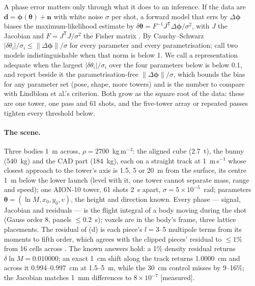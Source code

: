 \documentclass[10pt,a4paper]{article}
\newcommand{\tagM}{\textsf{\small[measured]}}
\begin{document}
A phase error matters only through what it does to an inference. If the data are
$\mathbf{d} = \boldsymbol\phi(\boldsymbol\theta)+\mathbf{n}$ with white noise $\sigma$ per shot,
a forward model that errs by $\Delta\boldsymbol\phi$ biases the maximum-likelihood estimate by
$\delta\boldsymbol\theta = F^{-1}J^{\mathsf T}\Delta\boldsymbol\phi/\sigma^2$, with $J$ the Jacobian
and $F = J^{\mathsf T}J/\sigma^2$ the Fisher matrix \citep[eq.~13]{cutler2007}. By Cauchy--Schwarz
$|\delta\theta_i|/\sigma_i\le\|\Delta\boldsymbol\phi\|/\sigma$ for every parameter and every
parametrisation; \citet[eq.~5]{lindblom2008} call two models indistinguishable when that norm is below
1. We call a representation adequate when the largest $|\delta\theta_i|/\sigma_i$ over the four
parameters below is below 0.1, and report beside it the parametrisation-free $\|\Delta\boldsymbol\phi\|/\sigma$,
which bounds the bias for any parameter set (pose, shape, more towers) and is the number to compare
with Lindblom et al.'s criterion. Both grow as the square root of the data: these are one tower, one
pass and 61 shots, and the five-tower array or repeated passes tighten every threshold below.

\paragraph{The scene.} Three bodies 1~m across, $\rho=2700$~kg\,m$^{-3}$: the aligned cube (2.7~t),
the bunny (540~kg) and the CAD part (184~kg), each on a straight track at 1~m\,s$^{-1}$ whose closest
approach to the tower's axis is 1.5, 5 or 20~m from the surface, its centre 1~m below the lower launch
(level with it, one tower cannot separate mass, range and speed); one AION-10 tower, 61 shots 2~s
apart, $\sigma = 5\times10^{-5}$~rad; parameters $\boldsymbol\theta = (\ln M, x_0, y_0, v)$, the
height and direction known. Every phase --- signal, Jacobian and residuals --- is the flight integral
of a body moving during the shot (Gauss order 8, panels $\le0.2$~s); voxels are in the body's frame,
three lattice placements. The residual of (d) is each piece's $l=3$--5 multipole terms from its
moments to fifth order, which agrees with the clipped pieces' residual to $\le1\%$ from 16 cells across \citep[R8]{paperrealread}. The known answers hold: a 1\% density
residual returns $\delta\ln M = 0.010000$; an exact 1~cm shift along the track returns 1.0000~cm and
across it 0.994--0.997~cm at 1.5--5~m, while the 30~cm control misses by 9--16\%; the Jacobian matches
1~mm differences to $8\times10^{-7}$ \tagM.
\end{document}
